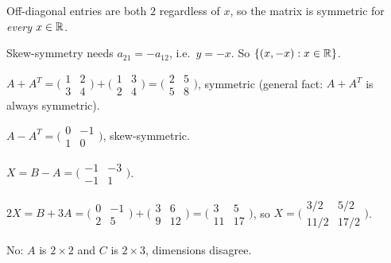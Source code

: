\begin{solutions}
  \item Off-diagonal entries are both $2$ regardless of $x$, so the matrix is symmetric for \emph{every} $x \in \mathbb{R}$.

  \item Skew-symmetry needs $a_{21} = -a_{12}$, i.e.\ $y = -x$. So $\{(x, -x) : x \in \mathbb{R}\}$.

  \item $A + A^{T} = \bigl(\begin{smallmatrix} 1 & 2 \\ 3 & 4 \end{smallmatrix}\bigr) + \bigl(\begin{smallmatrix} 1 & 3 \\ 2 & 4 \end{smallmatrix}\bigr) = \bigl(\begin{smallmatrix} 2 & 5 \\ 5 & 8 \end{smallmatrix}\bigr)$, symmetric (general fact: $A + A^{T}$ is always symmetric).

  \item $A - A^{T} = \bigl(\begin{smallmatrix} 0 & -1 \\ 1 & 0 \end{smallmatrix}\bigr)$, skew-symmetric.

  \item $X = B - A = \bigl(\begin{smallmatrix} -1 & -3 \\ -1 & 1 \end{smallmatrix}\bigr)$.

  \item $2 X = B + 3 A = \bigl(\begin{smallmatrix} 0 & -1 \\ 2 & 5 \end{smallmatrix}\bigr) + \bigl(\begin{smallmatrix} 3 & 6 \\ 9 & 12 \end{smallmatrix}\bigr) = \bigl(\begin{smallmatrix} 3 & 5 \\ 11 & 17 \end{smallmatrix}\bigr)$, so $X = \bigl(\begin{smallmatrix} 3/2 & 5/2 \\ 11/2 & 17/2 \end{smallmatrix}\bigr)$.

  \item No: $A$ is $2 \times 2$ and $C$ is $2 \times 3$, dimensions disagree.


\end{solutions}
